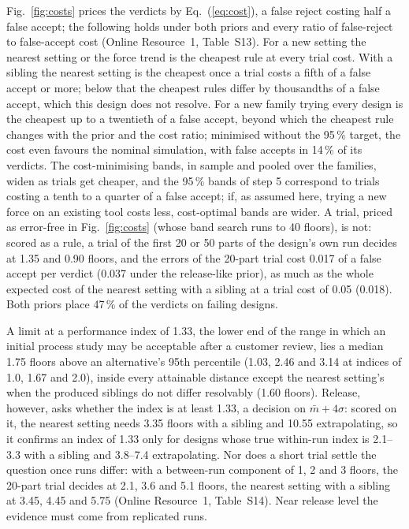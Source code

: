 \documentclass[pdflatex,sn-basic,lineno]{sn-jnl}
\newcommand{\ORt}[1]{Online Resource~1, Table~S#1}
\begin{document}
Fig.~\ref{fig:costs} prices the verdicts by Eq.~(\ref{eq:cost}), a false reject costing half a false accept; the following holds under both priors and every ratio of false-reject to false-accept cost (\ORt{13}). For a new setting the nearest setting or the force trend is the cheapest rule at every trial cost. With a sibling the nearest setting is the cheapest once a trial costs a fifth of a false accept or more; below that the cheapest rules differ by thousandths of a false accept, which this design does not resolve. For a new family trying every design is the cheapest up to a twentieth of a false accept, beyond which the cheapest rule changes with the prior and the cost ratio; minimised without the 95\,\% target, the cost even favours the nominal simulation, with false accepts in 14\,\% of its verdicts. The cost-minimising bands, in sample and pooled over the families, widen as trials get cheaper, and the 95\,\% bands of step 5 correspond to trials costing a tenth to a quarter of a false accept; if, as assumed here, trying a new force on an existing tool costs less, cost-optimal bands are wider. A trial, priced as error-free in Fig.~\ref{fig:costs} (whose band search runs to 40 floors), is not: scored as a rule, a trial of the first 20 or 50 parts of the design's own run decides at 1.35 and 0.90 floors, and the errors of the 20-part trial cost 0.017 of a false accept per verdict (0.037 under the release-like prior), as much as the whole expected cost of the nearest setting with a sibling at a trial cost of 0.05 (0.018). Both priors place 47\,\% of the verdicts on failing designs.

A limit at a performance index of 1.33, the lower end of the range in which an initial process study may be acceptable after a customer review, lies a median 1.75 floors above an alternative's 95th percentile (1.03, 2.46 and 3.14 at indices of 1.0, 1.67 and 2.0), inside every attainable distance except the nearest setting's when the produced siblings do not differ resolvably (1.60 floors). Release, however, asks whether the index is at least 1.33, a decision on $\bar m+4\sigma$: scored on it, the nearest setting needs 3.35 floors with a sibling and 10.55 extrapolating, so it confirms an index of 1.33 only for designs whose true within-run index is 2.1--3.3 with a sibling and 3.8--7.4 extrapolating. Nor does a short trial settle the question once runs differ: with a between-run component of 1, 2 and 3 floors, the 20-part trial decides at 2.1, 3.6 and 5.1 floors, the nearest setting with a sibling at 3.45, 4.45 and 5.75 (\ORt{14}). Near release level the evidence must come from replicated runs.
\end{document}

